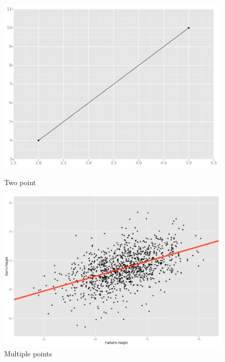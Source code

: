 \documentclass{article}
\begin{document}
\begin{figure}[H]
    \centering
    \begin{minipage}{.5\textwidth}
        \centering
        \includegraphics[width=\linewidth,height=\linewidth]{pic/two-points.png}
        \caption{Two point}
        \label{fig:two-points}
    \end{minipage}%
    \begin{minipage}{0.5\textwidth}
        \centering
        \includegraphics[width=\linewidth,height=\linewidth]{pic/multi-points.png}
        \caption{Multiple points}
        \label{fig:multi-points}
    \end{minipage}
\end{figure}
\end{document}
